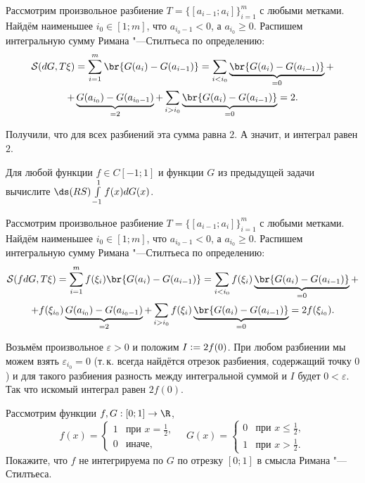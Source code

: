 \begin{solution}
    Рассмотрим произвольное разбиение $T = \{[a_{i - 1}; a_i]\}_{i = 1}^m$ с любыми метками. Найдём наименьшее $i_0 \in [1; m]$, что $a_{i_0 - 1} < 0$, а $a_{i_0} \geqslant 0$. Распишем интегральную сумму Римана "---Стилтьеса по определению:
    \begin{multline*}
        \mathcal{S}(dG, T\xi) = \sum_{i = 1}^m\br{G(a_i) - G(a_{i - 1})} = \sum_{i < i_0}\underbrace{\br{G(a_i) - G(a_{i - 1})}}_{= 0} +\\ + \underbrace{G(a_{i_0}) - G(a_{i_0 - 1})}_{= 2} + \sum_{i > i_0}\underbrace{\br{G(a_i) - G(a_{i - 1})}}_{= 0} = 2.
    \end{multline*}

    Получили, что для всех разбиений эта сумма равна $2$. А значит, и интеграл равен $2$.
\end{solution}

\begin{problem}[27$^\circ$]
    Для любой функции $f \in C[-1; 1]$ и функции $G$ из предыдущей задачи вычислите $\ds(RS)\int\limits_{-1}^1f(x)dG(x)$.
\end{problem}

\begin{solution}
    Рассмотрим произвольное разбиение $T = \{[a_{i - 1}; a_i]\}_{i = 1}^m$ с любыми метками. Найдём наименьшее $i_0 \in [1; m]$, что $a_{i_0 - 1} < 0$, а $a_{i_0} \geqslant 0$. Распишем интегральную сумму Римана "---Стилтьеса по определению:
    \begin{multline*}
        \mathcal{S}(fdG, T\xi) = \sum_{i = 1}^mf(\xi_i)\br{G(a_i) - G(a_{i - 1})} = \sum_{i < i_0}f(\xi_i)\underbrace{\br{G(a_i) - G(a_{i - 1})}}_{= 0} +\\ + f(\xi_{i_0})\underbrace{G(a_{i_0}) - G(a_{i_0 - 1})}_{= 2} + \sum_{i > i_0}f(\xi_i)\underbrace{\br{G(a_i) - G(a_{i - 1})}}_{= 0} = 2f(\xi_{i_0}).
    \end{multline*}

    Возьмём произвольное $\varepsilon > 0$ и положим $I \vcentcolon = 2f(0)$. При любом разбиении мы можем взять $\varepsilon_{i_0} = 0$ (т.\,к. всегда найдётся отрезок разбиения, содержащий точку $0$) и для такого разбиения разность между интегральной суммой и $I$ будет $0 < \varepsilon$. Так что искомый интеграл равен $2f(0)$.
\end{solution}

\begin{problem}[28$^\circ$]
    Рассмотрим функции $f, G: [0; 1] \to \R$,
    \[
        f(x) =
        \begin{cases}
            1 & \text{при $x = \frac{1}{2}$},\\
            0 & \text{иначе},
        \end{cases}\quad
        G(x) =
        \begin{cases}
            0 & \text{при $x \leqslant \frac{1}{2}$},\\
            1 & \text{при $x > \frac{1}{2}$}.
        \end{cases}
    \]
    Покажите, что $f$ не интегрируема по $G$ по отрезку $[0; 1]$ в смысла Римана "---Стилтьеса.
\end{problem}

